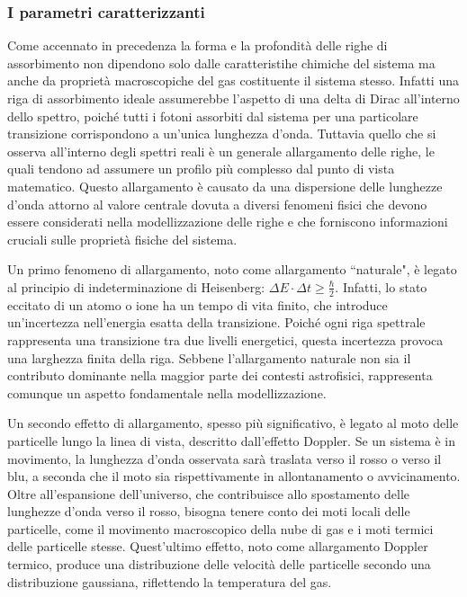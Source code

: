 \documentclass[a4paper,12pt]{article}
\begin{document}

\subsubsection{I parametri caratterizzanti}
Come accennato in precedenza la forma e la profondità delle righe di assorbimento non dipendono solo dalle caratteristihe chimiche del sistema ma anche da proprietà macroscopiche del gas costituente il sistema stesso. Infatti una riga di assorbimento ideale assumerebbe l'aspetto di una delta di Dirac all'interno dello spettro, poiché tutti i fotoni assorbiti dal sistema per una particolare transizione corrispondono a un'unica lunghezza d'onda. Tuttavia quello che si osserva all'interno degli spettri reali è un generale allargamento delle righe, le quali tendono ad assumere un profilo più complesso dal punto di vista matematico. Questo allargamento è causato da una dispersione delle lunghezze d'onda attorno al valore centrale dovuta a diversi fenomeni fisici che devono essere considerati nella modellizzazione delle righe e che forniscono informazioni cruciali sulle proprietà fisiche del sistema.

Un primo fenomeno di allargamento, noto come allargamento ``naturale", è legato al principio di indeterminazione di Heisenberg: $\Delta E \cdot \Delta t \geq \frac{\hbar}{2}$. Infatti, lo stato eccitato di un atomo o ione ha un tempo di vita finito, che introduce un'incertezza nell'energia esatta della transizione. Poiché ogni riga spettrale rappresenta una transizione tra due livelli energetici, questa incertezza provoca una larghezza finita della riga. Sebbene l’allargamento naturale non sia il contributo dominante nella maggior parte dei contesti astrofisici, rappresenta comunque un aspetto fondamentale nella modellizzazione.

Un secondo effetto di allargamento, spesso più significativo, è legato al moto delle particelle lungo la linea di vista, descritto dall'effetto Doppler. Se un sistema è in movimento, la lunghezza d'onda osservata sarà traslata verso il rosso o verso il blu, a seconda che il moto sia rispettivamente in allontanamento o avvicinamento. Oltre all'espansione dell'universo, che contribuisce allo spostamento delle lunghezze d'onda verso il rosso, bisogna tenere conto dei moti locali delle particelle, come il movimento macroscopico della nube di gas e i moti termici delle particelle stesse. Quest'ultimo effetto, noto come allargamento Doppler termico, produce una distribuzione delle velocità delle particelle secondo una distribuzione gaussiana, riflettendo la temperatura del gas.
\end{document}
